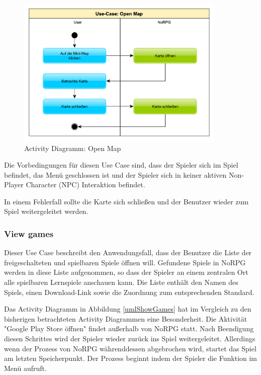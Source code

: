 			\begin{figure}[htbp]
				\centering 
				\label{umlOpenMap}
				\includegraphics[width=10cm]{pics/OpenMap.pdf}
				\caption{Activity Diagramm: Open Map}
			\end{figure}
			
			Die Vorbedingungen für diesen Use Case sind, dass der Spieler sich im Spiel befindet, das Menü geschlossen ist und der Spieler sich in keiner aktiven Non-Player Character (NPC) Interaktion befindet.
			
			In einem Fehlerfall sollte die Karte sich schließen und der Benutzer wieder zum Spiel weitergeleitet werden.
	
		\subsubsection{View games}
			Dieser Use Case beschreibt den Anwendungsfall, dass der Benutzer die Liste der freigeschalteten und spielbaren Spiele öffnen will. Gefundene Spiele in NoRPG werden in diese Liste aufgenommen, so dass der Spieler an einem zentralen Ort alle spielbaren Lernspiele anschauen kann. Die Liste enthält den Namen des Spiels, einen Download-Link sowie die Zuordnung zum entsprechenden Standard.
			
			Das Activity Diagramm in Abbildung \ref{umlShowGames} hat im Vergleich zu den bisherigen betrachteten Activity Diagrammen eine Besonderheit. Die Aktivität "Google Play Store öffnen" findet außerhalb von NoRPG statt. Nach Beendigung diesen Schrittes wird der Spieler wieder zurück ins Spiel weitergeleitet. Allerdings wenn der Prozess von NoRPG währenddessen abgebrochen wird, startet das Spiel am letzten Speicherpunkt. Der Prozess beginnt indem der Spieler die Funktion im Menü aufruft.
			
